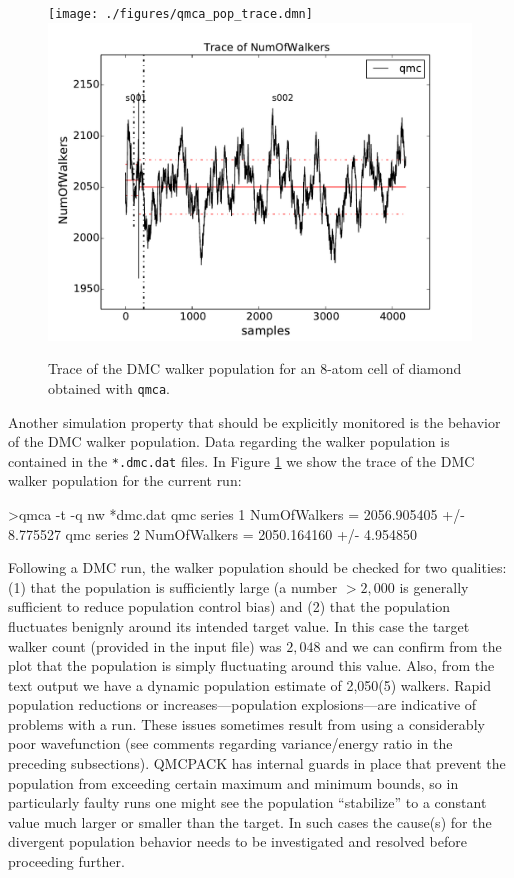 \begin{figure}
\begin{center}
  \ifdefined\HCode
\texttt{[image: ./figures/qmca\_pop\_trace.dmn]}
\else
\includegraphics[trim = 0mm 0mm 0mm 0mm, clip,width=0.75\columnwidth]{./figures/qmca_pop_trace.pdf}
\fi
\end{center}
\caption{Trace of the DMC walker population for an 8-atom cell of diamond obtained with \texttt{qmca}.}
\label{fig:qmca_pop_trace}
\end{figure}

Another simulation property that should be explicitly monitored  
is the behavior of the DMC walker population.  Data regarding the 
walker population is contained in the \texttt{*.dmc.dat} files.
In Figure \ref{fig:qmca_pop_trace} we show the trace of the DMC 
walker population for the current run:
\begin{shade}
>qmca -t -q nw *dmc.dat
qmc  series 1  NumOfWalkers          =  2056.905405 +/- 8.775527 
qmc  series 2  NumOfWalkers          =  2050.164160 +/- 4.954850 
\end{shade}
\noindent
Following a DMC run, the walker population should be checked for 
two qualities: (1) that the population is sufficiently large (a number 
$>2,000$ is generally sufficient to reduce population control bias) and  
(2) that the population fluctuates benignly around its intended target 
value. In this case the target walker count (provided in the input file)
was $2,048$ and we can confirm from the plot that the population is simply 
fluctuating around this value.  Also, from the text output we have a dynamic 
population estimate of 2,050(5) walkers.  Rapid population reductions or 
increases---population explosions---are indicative of problems with a run.  
These issues sometimes result from using a considerably poor wavefunction 
(see comments regarding variance/energy ratio in the preceding 
subsections).  QMCPACK has internal guards in place that prevent 
the population from exceeding certain maximum and minimum bounds, so 
in particularly faulty runs one might see the population ``stabilize'' 
to a constant value much larger or smaller than the target.  In such 
cases the cause(s) for the divergent population behavior needs to 
be investigated and resolved before proceeding further.



